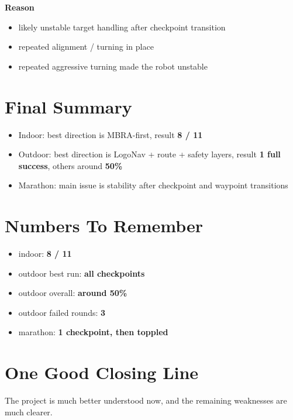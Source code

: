 \documentclass[11pt]{article}
\begin{document}
\textbf{Reason}
\begin{itemize}[leftmargin=*]
\item likely unstable target handling after checkpoint transition
\item repeated alignment / turning in place
\item repeated aggressive turning made the robot unstable
\end{itemize}

\section*{Final Summary}
\begin{itemize}[leftmargin=*]
\item Indoor: best direction is MBRA-first, result \textbf{8 / 11}
\item Outdoor: best direction is LogoNav + route + safety layers, result \textbf{1 full success}, others around \textbf{50\%}
\item Marathon: main issue is stability after checkpoint and waypoint transitions
\end{itemize}

\section*{Numbers To Remember}
\begin{itemize}[leftmargin=*]
\item indoor: \textbf{8 / 11}
\item outdoor best run: \textbf{all checkpoints}
\item outdoor overall: \textbf{around 50\%}
\item outdoor failed rounds: \textbf{3}
\item marathon: \textbf{1 checkpoint, then toppled}
\end{itemize}

\section*{One Good Closing Line}
The project is much better understood now, and the remaining weaknesses are much clearer.
\end{document}
